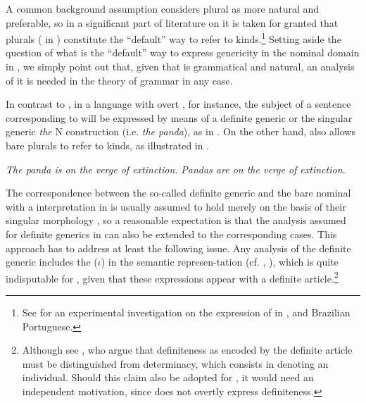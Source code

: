 \documentclass[output=paper
,modfonts
,nonflat]{langsci/langscibook}
\begin{document}
	A common background assumption considers plural  as more natural and preferable, so in a significant part of literature on  it is taken for granted that plurals ( in ) constitute the ``default'' way to refer to kinds.\footnote{See \citet{Ionin2011} for an experimental investigation on the expression of  in ,  and Brazilian Portuguese.} Setting aside the question of what is the ``default'' way to express genericity in the nominal domain in , we simply point out that, given that  is grammatical and natural, an analysis of it is needed in the theory of grammar in any case.
	
	In contrast to , in a language with overt ,  for instance, the subject of a sentence corresponding to  will be expressed by means of a definite generic \citep{Carlson1977} or the singular generic \citep{Chierchia1998} \textit{the} N construction (i.e. \textit{the panda}), as in . On the other hand,  also allows bare plurals to refer to kinds, as illustrated in .
	
	\ea\label{ex:borik:2}
	\ea\label{ex:borik:2a}
	\textit{The panda is on the verge of extinction.}
	\ex\label{ex:borik:2b}
	\textit{Pandas are on the verge of extinction.}
	\z
	\z
	
	The correspondence between the so-called  definite generic and the  bare nominal with a  interpretation in  is usually assumed to hold merely on the basis of their singular  morphology \citep[cf.][]{Dayal2004}, so a reasonable expectation is that the analysis assumed for definite generics in  can also be extended to the corresponding  cases. This approach has to address at least the following issue. Any analysis of the  definite generic includes the  ($\iota$) in the semantic represen\hyp{}\linebreak\newpage\noindent tation (cf. \citealt{Chierchia1998}, \citealt{Dayal2004}), which is quite indisputable for , given that these expressions appear with a definite article.\footnote{Although see \citet{CoppockBeaver2015}, who argue that definiteness as encoded by the definite article must be distinguished from determinacy, which consists in denoting an individual. Should this claim also be adopted for , it would need an independent motivation, since  does not overtly express definiteness.}
	
\end{document}
